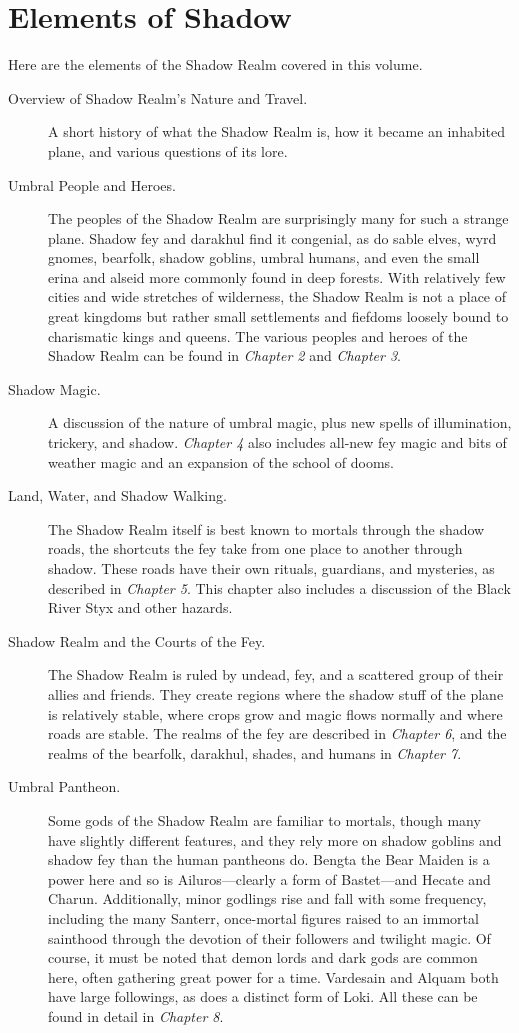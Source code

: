 \documentclass[10pt,a4paper,twoside,bg=print,twocolumn,openany,nodeprecatedcode]{dndbook}
\begin{document}
\section{Elements of Shadow}
Here are the elements of the Shadow Realm covered in this volume.


\begin{description}
\item[Overview of Shadow Realm's Nature and Travel.]
A short history of what the Shadow Realm is, how it became an inhabited plane, and various questions of its lore.
\item[Umbral People and Heroes.]
The peoples of the Shadow Realm are surprisingly many for such a strange plane. Shadow fey and darakhul find it congenial, as do sable elves, wyrd gnomes, bearfolk, shadow goblins, umbral humans, and even the small erina and alseid more commonly found in deep forests. With relatively few cities and wide stretches of wilderness, the Shadow Realm is not a place of great kingdoms but rather small settlements and fiefdoms loosely bound to charismatic kings and queens. The various peoples and heroes of the Shadow Realm can be found in \textit{Chapter 2} and \textit{Chapter 3}.
\item[Shadow Magic.]
A discussion of the nature of umbral magic, plus new spells of illumination, trickery, and shadow. \textit{Chapter 4} also includes all-new fey magic and bits of weather magic and an expansion of the school of dooms.
\item[Land, Water, and Shadow Walking.]
The Shadow Realm itself is best known to mortals through the shadow roads, the shortcuts the fey take from one place to another through shadow. These roads have their own rituals, guardians, and mysteries, as described in \textit{Chapter 5}. This chapter also includes a discussion of the Black River Styx and other hazards.
\item[Shadow Realm and the Courts of the Fey.]
The Shadow Realm is ruled by undead, fey, and a scattered group of their allies and friends. They create regions where the shadow stuff of the plane is relatively stable, where crops grow and magic flows normally and where roads are stable. The realms of the fey are described in \textit{Chapter 6}, and the realms of the bearfolk, darakhul, shades, and humans in \textit{Chapter 7}.
\item[Umbral Pantheon.]
Some gods of the Shadow Realm are familiar to mortals, though many have slightly different features, and they rely more on shadow goblins and shadow fey than the human pantheons do. Bengta the Bear Maiden is a power here and so is Ailuros—clearly a form of Bastet—and Hecate and Charun. Additionally, minor godlings rise and fall with some frequency, including the many Santerr, once-mortal figures raised to an immortal sainthood through the devotion of their followers and twilight magic. Of course, it must be noted that demon lords and dark gods are common here, often gathering great power for a time. Vardesain and Alquam both have large followings, as does a distinct form of Loki. All these can be found in detail in \textit{Chapter 8}.

\end{description}
\end{document}
